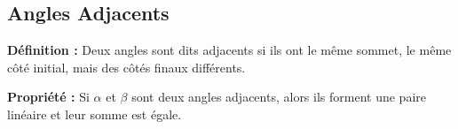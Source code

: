 \documentclass{report}
\begin{document}
      \subsection{Angles Adjacents}

      \textbf{Définition :} Deux angles sont dits adjacents si ils ont le même sommet, le même côté initial, mais des côtés finaux différents.

      \begin{center}
      \end{center}

      \textbf{Propriété :} Si $\alpha$ et $\beta$ sont deux angles adjacents, alors ils forment une paire linéaire et leur somme est égale.

    \fi











    \iffalse

        ooooooooooooooooooooooooo
                    O
                    O
                    O
                    O
                    O
                    O          OOOOOOOOOOO     OOOO
                    O          O               O   OO
                    O          OOOOO           O   OO
                    O          O               OOOO
                    O          O               0  0
                    O          OOOOOOOOOO      O   O

    \fi


















\end{document}
